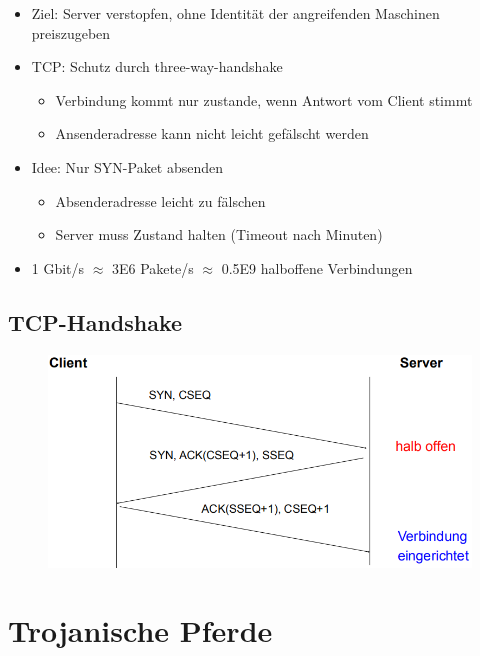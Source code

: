 \documentclass[openany]{book}
\begin{document}
\begin{itemize}
    \item Ziel: Server verstopfen, ohne Identität der angreifenden Maschinen preiszugeben
    \item TCP: Schutz durch three-way-handshake
    \begin{itemize}
        \item Verbindung kommt nur zustande, wenn Antwort vom Client stimmt
        \item Ansenderadresse kann nicht leicht gefälscht werden
    \end{itemize}
    \item Idee: Nur SYN-Paket absenden
    \begin{itemize}
        \item Absenderadresse leicht zu fälschen
        \item Server muss Zustand halten (Timeout nach Minuten)
    \end{itemize}
    \item 1 Gbit/s $\approx$ 3E6 Pakete/s $\approx$ 0.5E9 halboffene Verbindungen
\end{itemize}

\subsection{TCP-Handshake}

\begin{figure}[h!]
    \centering
    \includegraphics[width=0.85\linewidth]{Pics/TCP-Handshake.PNG}
\end{figure}

\section{Trojanische Pferde}
\end{document}
